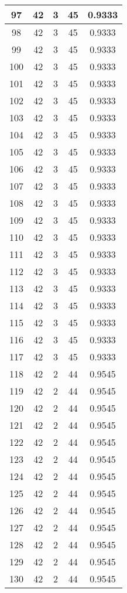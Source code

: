 \documentclass[letterpaper, 12pt]{article}
\begin{document}
\begin{longtable}{|c|c|c|c|c|}
\hline
97 & 42 & 3 & 45 & 0.9333 \\
\hline
98 & 42 & 3 & 45 & 0.9333 \\
\hline
99 & 42 & 3 & 45 & 0.9333 \\
\hline
100 & 42 & 3 & 45 & 0.9333 \\
\hline
101 & 42 & 3 & 45 & 0.9333 \\
\hline
102 & 42 & 3 & 45 & 0.9333 \\
\hline
103 & 42 & 3 & 45 & 0.9333 \\
\hline
104 & 42 & 3 & 45 & 0.9333 \\
\hline
105 & 42 & 3 & 45 & 0.9333 \\
\hline
106 & 42 & 3 & 45 & 0.9333 \\
\hline
107 & 42 & 3 & 45 & 0.9333 \\
\hline
108 & 42 & 3 & 45 & 0.9333 \\
\hline
109 & 42 & 3 & 45 & 0.9333 \\
\hline
110 & 42 & 3 & 45 & 0.9333 \\
\hline
111 & 42 & 3 & 45 & 0.9333 \\
\hline
112 & 42 & 3 & 45 & 0.9333 \\
\hline
113 & 42 & 3 & 45 & 0.9333 \\
\hline
114 & 42 & 3 & 45 & 0.9333 \\
\hline
115 & 42 & 3 & 45 & 0.9333 \\
\hline
116 & 42 & 3 & 45 & 0.9333 \\
\hline
117 & 42 & 3 & 45 & 0.9333 \\
\hline
118 & 42 & 2 & 44 & 0.9545 \\
\hline
119 & 42 & 2 & 44 & 0.9545 \\
\hline
120 & 42 & 2 & 44 & 0.9545 \\
\hline
121 & 42 & 2 & 44 & 0.9545 \\
\hline
122 & 42 & 2 & 44 & 0.9545 \\
\hline
123 & 42 & 2 & 44 & 0.9545 \\
\hline
124 & 42 & 2 & 44 & 0.9545 \\
\hline
125 & 42 & 2 & 44 & 0.9545 \\
\hline
126 & 42 & 2 & 44 & 0.9545 \\
\hline
127 & 42 & 2 & 44 & 0.9545 \\
\hline
128 & 42 & 2 & 44 & 0.9545 \\
\hline
129 & 42 & 2 & 44 & 0.9545 \\
\hline
130 & 42 & 2 & 44 & 0.9545 \\

\end{longtable}
\end{document}
